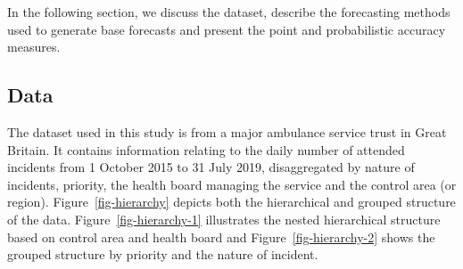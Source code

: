 \documentclass[
  authoryear,
  preprint,
  3p]{elsarticle}
\begin{document}
In the following section, we discuss the dataset, describe the
forecasting methods used to generate base forecasts and present the
point and probabilistic accuracy measures.

\hypertarget{sec-data}{%
\subsection{Data}\label{sec-data}}

The dataset used in this study is from a major ambulance service trust
in Great Britain. It contains information relating to the daily number
of attended incidents from 1 October 2015 to 31 July 2019, disaggregated
by nature of incidents, priority, the health board managing the service
and the control area (or region). Figure~\ref{fig-hierarchy} depicts
both the hierarchical and grouped structure of the data.
Figure~\ref{fig-hierarchy-1} illustrates the nested hierarchical
structure based on control area and health board and
Figure~\ref{fig-hierarchy-2} shows the grouped structure by priority and
the nature of incident.
\end{document}
